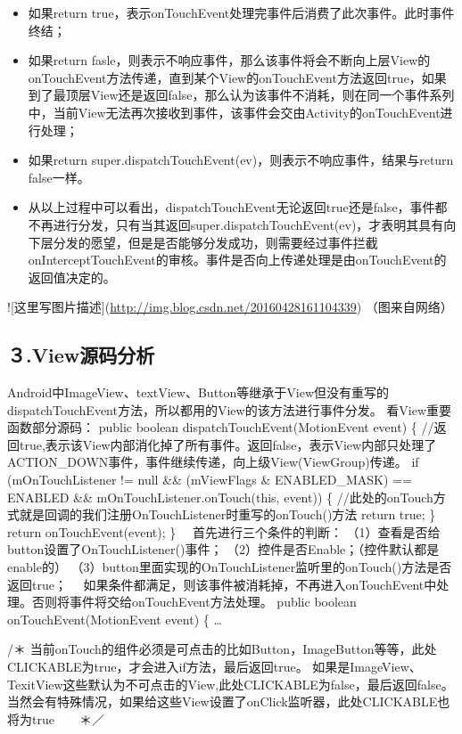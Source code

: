 \documentclass[9pt, b5paper]{article}
\begin{document}
\begin{itemize}
\item 如果return true，表示onTouchEvent处理完事件后消费了此次事件。此时事件终结；

\item 如果return fasle，则表示不响应事件，那么该事件将会不断向上层View的onTouchEvent方法传递，直到某个View的onTouchEvent方法返回true，如果到了最顶层View还是返回false，那么认为该事件不消耗，则在同一个事件系列中，当前View无法再次接收到事件，该事件会交由Activity的onTouchEvent进行处理；　　
\item 如果return super.dispatchTouchEvent(ev)，则表示不响应事件，结果与return false一样。
\item 从以上过程中可以看出，dispatchTouchEvent无论返回true还是false，事件都不再进行分发，只有当其返回super.dispatchTouchEvent(ev)，才表明其具有向下层分发的愿望，但是是否能够分发成功，则需要经过事件拦截onInterceptTouchEvent的审核。事件是否向上传递处理是由onTouchEvent的返回值决定的。
\end{itemize}
![这里写图片描述](\url{http://img.blog.csdn.net/20160428161104339})
（图来自网络）
\subsection{３.View源码分析}
\label{sec-12-3}
Android中ImageView、textView、Button等继承于View但没有重写的dispatchTouchEvent方法，所以都用的View的该方法进行事件分发。
看View重要函数部分源码：
public boolean dispatchTouchEvent(MotionEvent event) \{
//返回true,表示该View内部消化掉了所有事件。返回false，表示View内部只处理了ACTION\_DOWN事件，事件继续传递，向上级View(ViewGroup)传递。
    if (mOnTouchListener != null \&\& (mViewFlags \& ENABLED\_MASK) == ENABLED \&\&
            mOnTouchListener.onTouch(this, event)) \{
  //此处的onTouch方式就是回调的我们注册OnTouchListener时重写的onTouch()方法
        return true;
    \}
    return onTouchEvent(event);
\}
　首先进行三个条件的判断：
（1）查看是否给button设置了OnTouchListener()事件；
（2）控件是否Enable；（控件默认都是enable的）
（3）button里面实现的OnTouchListener监听里的onTouch()方法是否返回true；
　如果条件都满足，则该事件被消耗掉，不再进入onTouchEvent中处理。否则将事件将交给onTouchEvent方法处理。
 public boolean onTouchEvent(MotionEvent event) \{
    \ldots{}

  /＊ 当前onTouch的组件必须是可点击的比如Button，ImageButton等等，此处CLICKABLE为true，才会进入if方法，最后返回true。
如果是ImageView、TexitView这些默认为不可点击的View,此处CLICKABLE为false，最后返回false。当然会有特殊情况，如果给这些View设置了onClick监听器，此处CLICKABLE也将为true　　＊／
\end{document}
